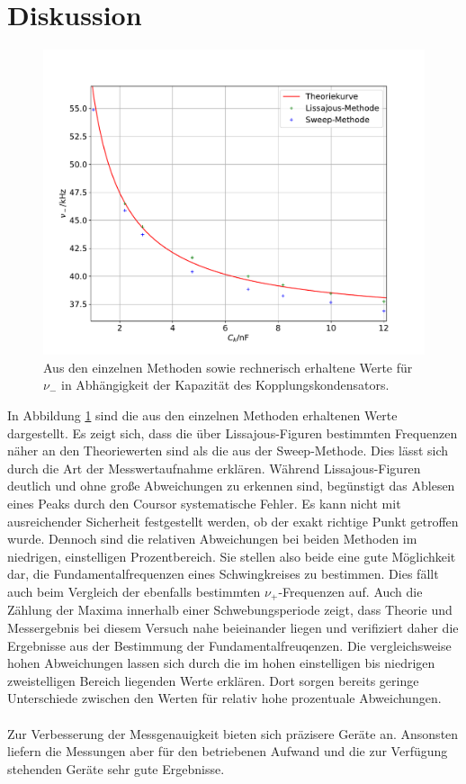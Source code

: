 \section{Diskussion}
\begin{figure}
  \centering
  \includegraphics[scale=0.6]{Methoden.pdf}
  \caption{Aus den einzelnen Methoden sowie rechnerisch erhaltene Werte für $\nu_-$ in
  Abhängigkeit der Kapazität des Kopplungskondensators.}
  \label{abb:1}
\end{figure}
In Abbildung \ref{abb:1} sind die aus den einzelnen Methoden erhaltenen Werte dargestellt.
Es zeigt sich, dass die über Lissajous-Figuren bestimmten Frequenzen näher an den Theoriewerten
sind als die aus der Sweep-Methode. Dies lässt sich durch die Art der Messwertaufnahme erklären.
Während Lissajous-Figuren deutlich und ohne große Abweichungen zu erkennen sind,
begünstigt das Ablesen eines Peaks durch den Coursor systematische Fehler. Es kann nicht
mit ausreichender Sicherheit festgestellt werden, ob der exakt richtige Punkt getroffen wurde.
Dennoch sind die relativen Abweichungen bei beiden Methoden im niedrigen, einstelligen Prozentbereich.
Sie stellen also beide eine gute Möglichkeit dar, die Fundamentalfrequenzen eines Schwingkreises
zu bestimmen. Dies fällt auch beim Vergleich der ebenfalls bestimmten $\nu_+$-Frequenzen auf.
Auch die Zählung der Maxima innerhalb einer Schwebungsperiode zeigt, dass
Theorie und Messergebnis bei diesem Versuch nahe beieinander liegen und verifiziert daher die
Ergebnisse aus der Bestimmung der Fundamentalfreuqenzen. Die vergleichsweise hohen Abweichungen
lassen sich durch die im hohen einstelligen bis niedrigen zweistelligen Bereich liegenden Werte
erklären. Dort sorgen bereits geringe Unterschiede zwischen den Werten
für relativ hohe prozentuale Abweichungen.\\
\\
Zur Verbesserung der Messgenauigkeit bieten sich präzisere Geräte an. Ansonsten liefern die
Messungen aber für den betriebenen Aufwand und die zur Verfügung stehenden Geräte sehr gute
Ergebnisse.
\newpage
\nocite{*}
\printbibliography
